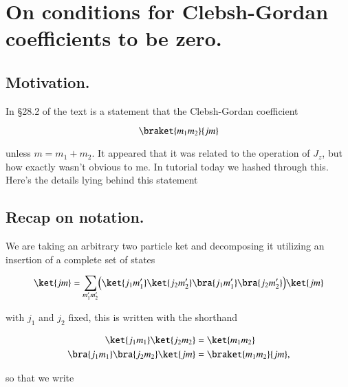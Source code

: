 %
%

\chapter{On conditions for Clebsh-Gordan coefficients to be zero.}
\label{chap:ClebshGordan}
{}
\date{Nov 23, 2011}

\beginArtWithToc

\section{Motivation.}

In \S 28.2 of the text \cite{desai2009quantum} is a statement that the Clebsh-Gordan coefficient

\begin{equation}\label{eqn:ClebshGordan:10}
\braket{m_1 m_2}{jm}
\end{equation}

unless $m = m_1 + m_2$.  It appeared that it was related to the operation of $J_z$, but how exactly wasn't obvious to me.  In tutorial today we hashed through this.  Here's the details lying behind this statement

\section{Recap on notation.}

We are taking an arbitrary two particle ket and decomposing it utilizing an insertion of a complete set of states

\begin{equation}\label{eqn:ClebshGordan:30}
\ket{jm} = \sum_{m_1' m_2'} 
\Bigl(
\ket{j_1 m_1'} \ket{j_2 m_2'}
\bra{j_1 m_1'} \bra{j_2 m_2'}
\Bigr)
\ket{jm}
\end{equation}

with $j_1$ and $j_2$ fixed, this is written with the shorthand

\begin{align}\label{eqn:ClebshGordan:50}
\ket{j_1 m_1} \ket{j_2 m_2} &= \ket{m_1 m_2} \\
\bra{j_1 m_1} \bra{j_2 m_2} \ket{jm} &= \braket{m_1 m_2}{jm},
\end{align}

so that we write

